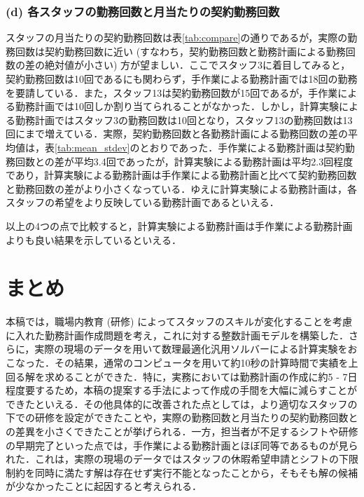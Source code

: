 \documentclass[11pt]{jsarticle}
\begin{document}
\subsubsection*{(d) 各スタッフの勤務回数と月当たりの契約勤務回数}
スタッフの月当たりの契約勤務回数は表\ref{tab:compare}の通りであるが，実際の勤務回数は契約勤務回数に近い (すなわち，契約勤務回数と勤務計画による勤務回数の差の絶対値が小さい) 方が望ましい．ここでスタッフ3に着目してみると，契約勤務回数は10回であるにも関わらず，手作業による勤務計画では18回の勤務を要請している．また，スタッフ13は契約勤務回数が15回であるが，手作業による勤務計画では10回しか割り当てられることがなかった．しかし，計算実験による勤務計画ではスタッフ3の勤務回数は10回となり，スタッフ13の勤務回数は13回にまで増えている．実際，契約勤務回数と各勤務計画による勤務回数の差の平均値は，表\ref{tab:mean_stdev}のとおりであった．手作業による勤務計画は契約勤務回数との差が平均3.4回であったが，計算実験による勤務計画は平均2.3回程度であり，計算実験による勤務計画は手作業による勤務計画と比べて契約勤務回数と勤務回数の差がより小さくなっている．ゆえに計算実験による勤務計画は，各スタッフの希望をより反映している勤務計画であるといえる．

\vspace{\baselineskip}
以上の4つの点で比較すると，計算実験による勤務計画は手作業による勤務計画よりも良い結果を示しているといえる．
\newpage

\section{まとめ}
本稿では，職場内教育 (研修) によってスタッフのスキルが変化することを考慮に入れた勤務計画作成問題を考え，これに対する整数計画モデルを構築した．さらに，実際の現場のデータを用いて数理最適化汎用ソルバーによる計算実験をおこなった．その結果，通常のコンピュータを用いて約10秒の計算時間で実績を上回る解を求めることができた．特に，実務においては勤務計画の作成に約5 - 7日程度要するため，本稿の提案する手法によって作成の手間を大幅に減らすことができたといえる．その他具体的に改善された点としては，より適切なスタッフの下での研修を設定ができたことや，実際の勤務回数と月当たりの契約勤務回数との差異を小さくできたことが挙げられる．一方，担当者が不足するシフトや研修の早期完了といった点では，手作業による勤務計画とほぼ同等であるものが見られた．これは，実際の現場のデータではスタッフの休暇希望申請とシフトの下限制約を同時に満たす解は存在せず実行不能となったことから，そもそも解の候補が少なかったことに起因すると考えられる．
\end{document}
